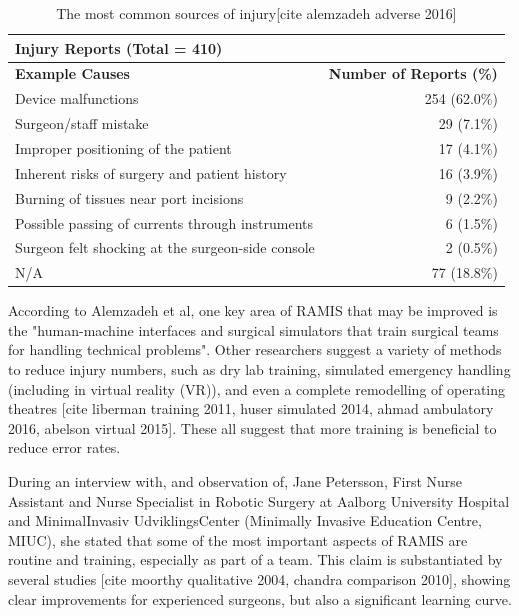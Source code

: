 \documentclass[conference]{IEEEtran}
\begin{document}
\begin{table}[H]
\centering
\begin{tabular}{@{}lr@{}}
\toprule
\multicolumn{2}{l}{\textbf{Injury Reports (Total = 410)}}                           \\ \midrule
\textbf{Example Causes}                           & \textbf{Number of Reports (\%)} \\ \midrule
Device malfunctions                               & 254 (62.0\%)                    \\
Surgeon/staff mistake                             & 29 (7.1\%)                      \\
Improper positioning of the patient               & 17 (4.1\%)                      \\
Inherent risks of surgery and patient history     & 16 (3.9\%)                      \\
Burning of tissues near port incisions            & 9 (2.2\%)                       \\
Possible passing of currents through instruments           & 6 (1.5\%)                       \\
Surgeon felt shocking at the surgeon-side console & 2 (0.5\%)                       \\
N/A                                               & 77 (18.8\%)                     \\ \toprule
\end{tabular}
\caption{The most common sources of injury[cite alemzadeh adverse 2016]}
\label{tab:Alam}
\end{table}

According to Alemzadeh et al, one key area of RAMIS that may be improved is the "human-machine interfaces and surgical simulators that train surgical teams for handling technical problems". Other researchers suggest a variety of methods to reduce injury numbers, such as dry lab training, simulated emergency handling (including in virtual reality (VR)), and even a complete remodelling of operating theatres [cite liberman training 2011, huser simulated 2014, ahmad ambulatory 2016, abelson virtual 2015]. These all suggest that more training is beneficial to reduce error rates.

During an interview with, and observation of, Jane Petersson, First Nurse Assistant and Nurse Specialist in Robotic Surgery at Aalborg University Hospital and MinimalInvasiv UdviklingsCenter (Minimally Invasive Education Centre, MIUC), she stated that some of the most important aspects of RAMIS are routine and training, especially as part of a team. This claim is substantiated by several studies [cite moorthy qualitative 2004, chandra comparison 2010], showing clear improvements for experienced surgeons, but also a significant learning curve.
\end{document}
